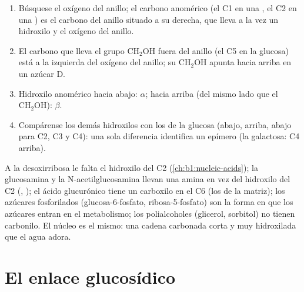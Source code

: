 \begin{method}\label{met:b1:carbohydrates:haworth}
\begin{enumerate}
  \item Búsquese el oxígeno del anillo; el carbono anomérico (el C1 en una
        , el C2 en una ) es el carbono del anillo situado a su
        derecha, que lleva a la vez un hidroxilo y el oxígeno del anillo.
  \item El carbono que lleva el grupo $\mathrm{CH_2OH}$ fuera del anillo
        (el C5 en la glucosa) está a la izquierda del oxígeno del anillo;
        su $\mathrm{CH_2OH}$ apunta hacia arriba en un azúcar D.
  \item Hidroxilo anomérico hacia abajo: $\alpha$; hacia arriba (del mismo
        lado que el $\mathrm{CH_2OH}$): $\beta$.
  \item Compárense los demás hidroxilos con los de la glucosa (abajo,
        arriba, abajo para C2, C3 y C4): una sola diferencia identifica un
        epímero (la galactosa: C4 arriba).
\end{enumerate}
\end{method}

\begin{example}\label{ex:b1:carbohydrates:derivatives}
A la desoxirribosa le falta el hidroxilo del C2
(\cref{ch:b1:nucleic-acids}); la glucosamina y la
N-acetilglucosamina llevan una amina en vez del hidroxilo del C2 (,
); el ácido glucurónico tiene un carboxilo en el C6 (los
 de la matriz); los azúcares fosforilados (glucosa-6-fosfato,
ribosa-5-fosfato) son la forma en que los azúcares entran en el metabolismo;
los polialcoholes (glicerol, sorbitol) no tienen carbonilo. El núcleo es el
mismo: una cadena carbonada corta y muy hidroxilada que el agua adora.
\end{example}

\section{El enlace glucosídico}

